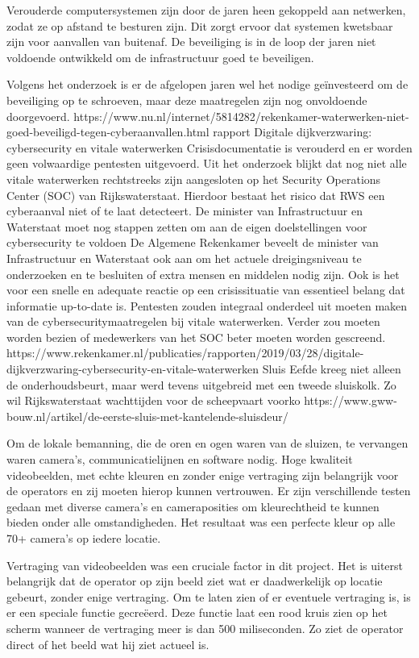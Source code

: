 {{Verouderde computersystemen zijn door de jaren heen gekoppeld aan netwerken, zodat ze op afstand te besturen zijn. Dit zorgt ervoor dat systemen kwetsbaar zijn voor aanvallen van buitenaf. De beveiliging is in de loop der jaren niet voldoende ontwikkeld om de infrastructuur goed te beveiligen.

Volgens het onderzoek is er de afgelopen jaren wel het nodige geïnvesteerd om de beveiliging op te schroeven, maar deze maatregelen zijn nog onvoldoende doorgevoerd.
https://www.nu.nl/internet/5814282/rekenkamer-waterwerken-niet-goed-beveiligd-tegen-cyberaanvallen.html
rapport Digitale dijkverzwaring: cybersecurity en vitale waterwerken 
Crisisdocumentatie is verouderd en er worden geen volwaardige pentesten uitgevoerd. Uit het onderzoek blijkt dat nog niet alle vitale waterwerken rechtstreeks zijn aangesloten op het Security Operations Center (SOC) van Rijkswaterstaat. Hierdoor bestaat het risico dat RWS een cyberaanval niet of te laat detecteert. De minister van Infrastructuur en Waterstaat moet nog stappen zetten om aan de eigen doelstellingen voor cybersecurity te voldoen
De Algemene Rekenkamer beveelt de minister van Infrastructuur en Waterstaat ook aan om het actuele dreigingsniveau te onderzoeken en te besluiten of extra mensen en middelen nodig zijn. Ook is het voor een snelle en adequate reactie op een crisissituatie van essentieel belang dat informatie up-to-date is. Pentesten zouden integraal onderdeel uit moeten maken van de cybersecuritymaatregelen bij vitale waterwerken. Verder zou moeten worden bezien of medewerkers van het SOC beter moeten worden gescreend.
https://www.rekenkamer.nl/publicaties/rapporten/2019/03/28/digitale-dijkverzwaring-cybersecurity-en-vitale-waterwerken
Sluis Eefde kreeg niet alleen de onderhoudsbeurt, maar werd tevens uitgebreid met een tweede sluiskolk. Zo wil Rijkswaterstaat wachttijden voor de scheepvaart voorko
https://www.gww-bouw.nl/artikel/de-eerste-sluis-met-kantelende-sluisdeur/

Om de lokale bemanning, die de oren en ogen waren van de sluizen, te vervangen waren camera’s, communicatielijnen en software nodig. Hoge kwaliteit videobeelden, met echte kleuren en zonder enige vertraging zijn belangrijk voor de operators en zij moeten hierop kunnen vertrouwen. Er zijn verschillende testen gedaan met diverse camera’s en cameraposities om kleurechtheid te kunnen bieden onder alle omstandigheden. Het resultaat was een perfecte kleur op alle 70+ camera’s op iedere locatie.

Vertraging van videobeelden was een cruciale factor in dit project. Het is uiterst belangrijk dat de operator op zijn beeld ziet wat er daadwerkelijk op locatie gebeurt, zonder enige vertraging. Om te laten zien of er eventuele vertraging is, is er een speciale functie gecreëerd. Deze functie laat een rood kruis zien op het scherm wanneer de vertraging meer is dan 500 miliseconden. Zo ziet de operator direct of het beeld wat hij ziet actueel is. 

}}
